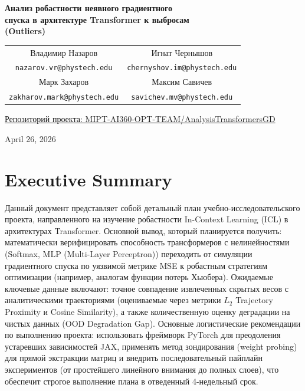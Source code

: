 \documentclass[12pt,a4paper]{article}
\begin{document}
\begin{center}
    \LARGE \bfseries
    Анализ робастности неявного градиентного \\
    спуска в архитектуре Transformer к выбросам \\
    (Outliers)
\end{center}

\vspace{0.8cm}

\begin{center}
    \begin{tabular}{cc}
        \large Владимир Назаров & \large Игнат Чернышов \\
        \texttt{nazarov.vr@phystech.edu} & \texttt{chernyshov.im@phystech.edu} \\
        \rule{0pt}{4ex} %
        \large Марк Захаров & \large Максим Савичев \\
        \texttt{zakharov.mark@phystech.edu} & \texttt{savichev.mv@phystech.edu}
    \end{tabular}
\end{center}

\begin{center}
    \normalsize\href{https://github.com/MIPT-AI360-OPT-TEAM/AnalysisTransformersGD}{Репозиторий проекта: MIPT-AI360-OPT-TEAM/AnalysisTransformersGD}
\end{center}

\vspace{0.8cm}

\begin{center}
    \large April 26, 2026
\end{center}

\vspace{1cm}


\section*{Executive Summary}
Данный документ представляет собой детальный план учебно-исследовательского проекта, направленного на изучение робастности In-Context Learning (ICL) в архитектурах Transformer. Основной вывод, который планируется получить: математически верифицировать способность трансформеров с нелинейностями (Softmax, MLP (Multi-Layer Perceptron)) переходить от симуляции градиентного спуска по уязвимой метрике MSE к робастным стратегиям оптимизации (например, аналогам функции потерь Хьюбера). Ожидаемые ключевые данные включают: точное совпадение извлеченных скрытых весов с аналитическими траекториями (оцениваемые через метрики $L_2$ Trajectory Proximity и Cosine Similarity), а также количественную оценку деградации на чистых данных (OOD Degradation Gap). Основные логистические рекомендации по выполнению проекта: использовать фреймворк PyTorch для преодоления устаревших зависимостей JAX, применять метод зондирования (weight probing) для прямой экстракции матриц и внедрить последовательный пайплайн экспериментов (от простейшего линейного внимания до полных слоев), что обеспечит строгое выполнение плана в отведенный 4-недельный срок.
\end{document}
